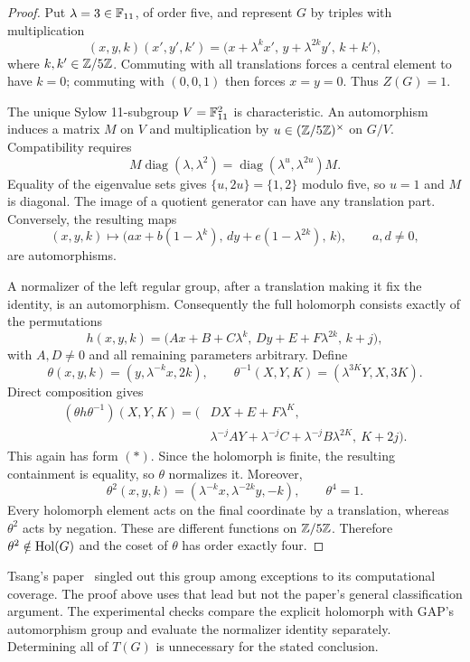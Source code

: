 \begin{proof}
Put $\lambda=3\in\mathbb F_{11}$, of order five, and represent
$G$ by triples with multiplication
\[
(x,y,k)(x',y',k')
 =\bigl(x+\lambda^kx',\,y+\lambda^{2k}y',\,k+k'\bigr),
\]
where $k,k'\in\mathbb Z/5\mathbb Z$. Commuting with all translations
forces a central element to have $k=0$; commuting with
$(0,0,1)$ then forces $x=y=0$. Thus $Z(G)=1$.

The unique Sylow 11-subgroup $V=\mathbb F_{11}^2$ is
characteristic. An automorphism induces a matrix $M$
on $V$ and multiplication by
$u\in(\mathbb Z/5\mathbb Z)^\times$ on $G/V$. Compatibility requires
\[
M\operatorname{diag}(\lambda,\lambda^2)
 =\operatorname{diag}(\lambda^u,\lambda^{2u})M.
\]
Equality of the eigenvalue sets gives
$\{u,2u\}=\{1,2\}$ modulo five, so $u=1$ and $M$ is
diagonal. The image of a quotient generator can have
any translation part. Conversely, the resulting maps
\[
(x,y,k)\longmapsto
\bigl(ax+b(1-\lambda^k),\,
dy+e(1-\lambda^{2k}),\,k\bigr),
\qquad a,d\ne0,
\]
are automorphisms.

A normalizer of the left regular group, after a
translation making it fix the identity, is an
automorphism. Consequently the full holomorph consists
exactly of the permutations
\[
h(x,y,k)=
\bigl(Ax+B+C\lambda^k,\,
Dy+E+F\lambda^{2k},\,k+j\bigr),
\tag{$*$}
\]
with $A,D\ne0$ and all remaining parameters arbitrary.
Define
\[
\theta(x,y,k)=(y,\lambda^{-k}x,2k),\qquad
\theta^{-1}(X,Y,K)=(\lambda^{3K}Y,X,3K).
\]
Direct composition gives
\begin{align*}
(\theta h\theta^{-1})(X,Y,K)
 =\bigl(&DX+E+F\lambda^K,\\
        &\lambda^{-j}AY+\lambda^{-j}C+
                    \lambda^{-j}B\lambda^{2K},\ K+2j\bigr).
\end{align*}
This again has form $(*)$. Since the holomorph is finite,
the resulting containment is equality, so $\theta$ normalizes it.
Moreover,
\[
\theta^2(x,y,k)=(\lambda^{-k}x,\lambda^{-2k}y,-k),
\qquad \theta^4=1.
\]
Every holomorph element acts on the final coordinate
by a translation, whereas $\theta^2$ acts by negation.
These are different functions on $\mathbb Z/5\mathbb Z$. Therefore
$\theta^2\notin\operatorname{Hol}(G)$ and the coset of $\theta$ has
order exactly four.
\end{proof}

Tsang's paper~\cite{tsang} singled out this group among
exceptions to its computational coverage. The proof
above uses that lead but not the paper's general
classification argument. The experimental checks
compare the explicit holomorph with GAP's automorphism
group and evaluate the normalizer identity separately.
Determining all of $T(G)$ is unnecessary for the stated
conclusion.


